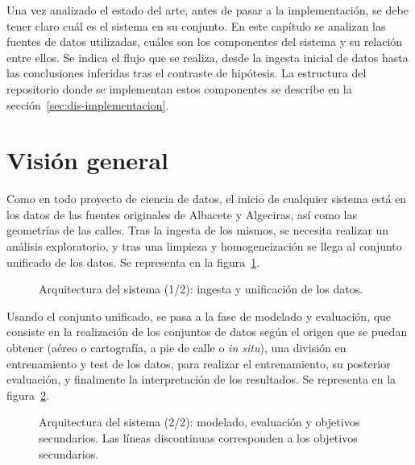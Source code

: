 \label{cap:arquitectura}

Una vez analizado el estado del arte, antes de pasar a la implementación, se debe tener claro cuál es el sistema en su conjunto. En este capítulo se analizan las fuentes de datos utilizadas, cuáles son los componentes del sistema y su relación entre ellos. Se indica el flujo que se realiza, desde la ingesta inicial de datos hasta las conclusiones inferidas tras el contraste de hipótesis. La estructura del repositorio donde se implementan estos componentes se describe en la sección~\ref{sec:dis-implementacion}.
\\


\section{Visión general}
\label{sec:arq-vision}

Como en todo proyecto de ciencia de datos, el inicio de cualquier sistema está en los datos de las fuentes originales de Albacete y Algeciras, así como las geometrías de las calles. Tras la ingesta de los mismos, se necesita realizar un análisis exploratorio, y tras una limpieza y homogeneización se llega al conjunto unificado de los datos. Se representa en la figura~\ref{fig:arquitectura-ingesta}.
\\

\begin{figure}[htbp]
  \centering
  \resizebox{\linewidth}{!}{}
  \caption{Arquitectura del sistema (1/2): ingesta y unificación de los datos.}
  \label{fig:arquitectura-ingesta}
\end{figure}

Usando el conjunto unificado, se pasa a la fase de modelado y evaluación, que consiste en la realización de los conjuntos de datos según el origen que se puedan obtener (aéreo o cartografía, a pie de calle o \textit{in situ}), una división en entrenamiento y test de los datos, para realizar el entrenamiento, su posterior evaluación, y finalmente la interpretación de los resultados. Se representa en la figura~\ref{fig:arquitectura-modelado}.
\\

\begin{figure}[htbp]
  \centering
  \resizebox{\linewidth}{!}{}
  \caption{Arquitectura del sistema (2/2): modelado, evaluación y objetivos secundarios. Las líneas discontinuas corresponden a los objetivos secundarios.}
  \label{fig:arquitectura-modelado}
\end{figure}


